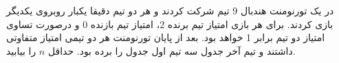 در یک تورنومنت هندبال 9 تیم شرکت کردند و هر دو تیم دقیقا یکبار روبروی یکدیگر بازی کردند. برای هر بازی امتیاز تیم برنده 2، امتیاز تیم بازنده 0 و درصورت تساوی امتیاز دو تیم برابر 1 خواهد بود. بعد از پایان تورنومنت هر دو تیمی امتیاز متفاوتی داشتند و تیم آخر جدول سه تیم اول جدول را برده بود. حداقل $n$ را بیابید.